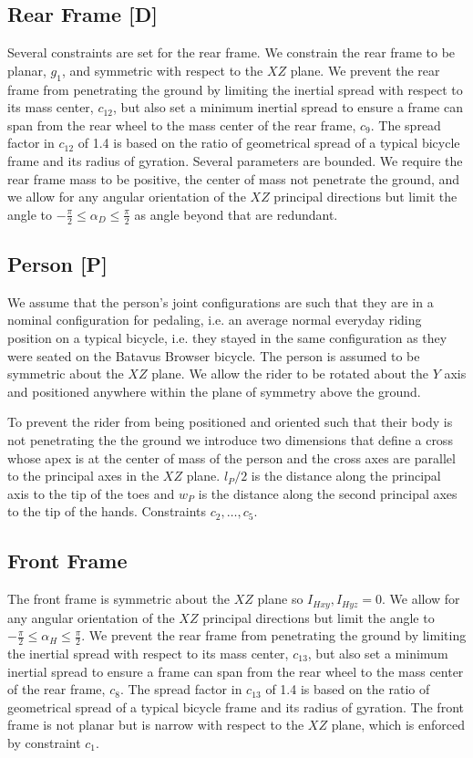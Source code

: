 \documentclass{bmd2019a}
\begin{document}
\subsection*{Rear Frame [D]}
%
Several constraints are set for the rear frame. We constrain the rear frame to
be planar, $g_1$, and symmetric with respect to the $XZ$ plane. We prevent the
rear frame from penetrating the ground by limiting the inertial spread with
respect to its mass center, $c_{12}$, but also set a minimum inertial spread to
ensure a frame can span from the rear wheel to the mass center of the rear
frame, $c_9$. The spread factor in $c_{12}$ of 1.4 is based on the ratio of
geometrical spread of a typical bicycle frame and its radius of gyration.
Several parameters are bounded. We require the rear frame mass to be positive,
the center of mass not penetrate the ground, and we allow for any angular
orientation of the $XZ$ principal directions but limit the angle to
$-\frac{\pi}{2} \leq \alpha_D \leq \frac{\pi}{2}$ as angle beyond that are
redundant.

\subsection{Person [P]}

We assume that the person's joint configurations are such that they are in a
nominal configuration for pedaling, i.e. an average normal everyday riding
position on a typical bicycle, i.e. they stayed in the same configuration as
they were seated on the Batavus Browser bicycle. The person is assumed to be
symmetric about the $XZ$ plane. We allow the rider to be rotated about the $Y$
axis and positioned anywhere within the plane of symmetry above the ground.

To prevent the rider from being positioned and oriented such that their body is
not penetrating the the ground we introduce two dimensions that define a cross
whose apex is at the center of mass of the person and the cross axes are
parallel to the principal axes in the $XZ$ plane. $l_P / 2$ is the distance
along the principal axis to the tip of the toes and $w_P$ is the distance along
the second principal axes to the tip of the hands. Constraints
$c_2,\ldots,c_5$.

\subsection{Front Frame}

The front frame is symmetric about the $XZ$ plane so $I_{Hxy}, I_{Hyz} = 0$. We
allow for any angular orientation of the $XZ$ principal directions but limit
the angle to $-\frac{\pi}{2} \leq \alpha_H \leq \frac{\pi}{2}$.  We prevent the
rear frame from penetrating the ground by limiting the inertial spread with
respect to its mass center, $c_{13}$, but also set a minimum inertial spread to
ensure a frame can span from the rear wheel to the mass center of the rear
frame, $c_8$. The spread factor in $c_{13}$ of 1.4 is based on the ratio of
geometrical spread of a typical bicycle frame and its radius of gyration. The
front frame is not planar but is narrow with respect to the $XZ$ plane, which
is enforced by constraint $c_1$.
\end{document}

